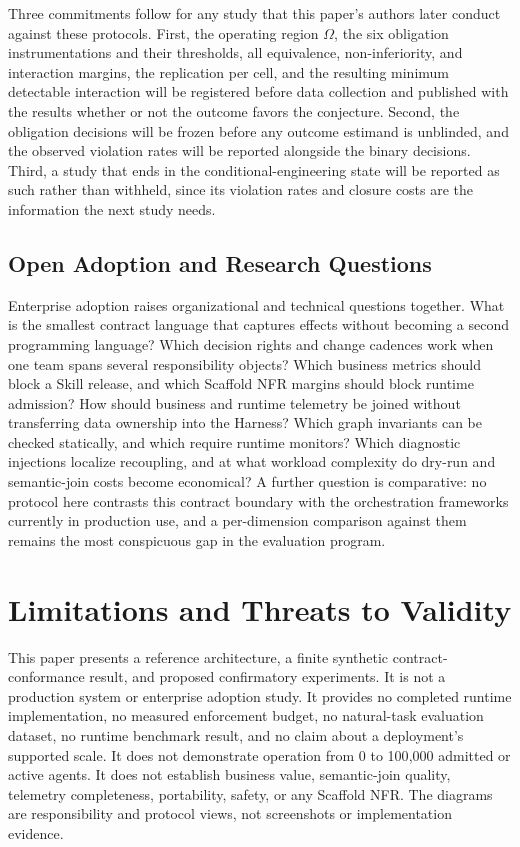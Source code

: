 Three commitments follow for any study that this paper's authors later conduct against these protocols. First, the operating region $\Omega$, the six obligation instrumentations and their thresholds, all equivalence, non-inferiority, and interaction margins, the replication per cell, and the resulting minimum detectable interaction will be registered before data collection and published with the results whether or not the outcome favors the conjecture. Second, the obligation decisions will be frozen before any outcome estimand is unblinded, and the observed violation rates will be reported alongside the binary decisions. Third, a study that ends in the conditional-engineering state will be reported as such rather than withheld, since its violation rates and closure costs are the information the next study needs.

\subsection{Open Adoption and Research Questions}

Enterprise adoption raises organizational and technical questions together. What is the smallest contract language that captures effects without becoming a second programming language? Which decision rights and change cadences work when one team spans several responsibility objects? Which business metrics should block a Skill release, and which Scaffold NFR margins should block runtime admission? How should business and runtime telemetry be joined without transferring data ownership into the Harness? Which graph invariants can be checked statically, and which require runtime monitors? Which diagnostic injections localize recoupling, and at what workload complexity do dry-run and semantic-join costs become economical? A further question is comparative: no protocol here contrasts this contract boundary with the orchestration frameworks currently in production use, and a per-dimension comparison against them remains the most conspicuous gap in the evaluation program.

\section{Limitations and Threats to Validity}
\label{sec:limitations}

This paper presents a reference architecture, a finite synthetic contract-conformance result, and proposed confirmatory experiments. It is not a production system or enterprise adoption study. It provides no completed runtime implementation, no measured enforcement budget, no natural-task evaluation dataset, no runtime benchmark result, and no claim about a deployment's supported scale. It does not demonstrate operation from 0 to 100{,}000 admitted or active agents. It does not establish business value, semantic-join quality, telemetry completeness, portability, safety, or any Scaffold NFR. The diagrams are responsibility and protocol views, not screenshots or implementation evidence.

